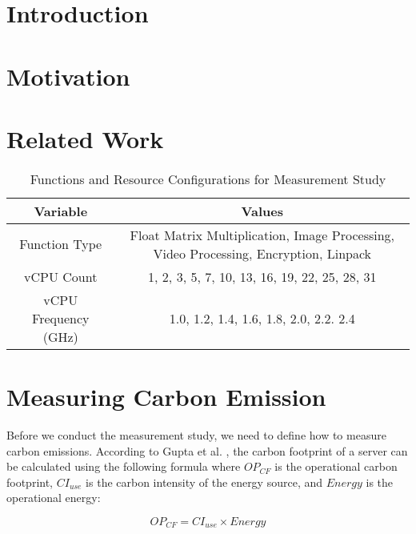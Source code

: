 \documentclass[times, 10pt,twocolumn]{article}
\begin{document}
\section{Introduction}

\section{Motivation}

\section{Related Work}

\begin{table*}[htbp]
   \centering
   \begin{tabular}{|c|c|}
   \hline
   \textbf{Variable} & \textbf{Values} \\ \hline
   Function Type & Float Matrix Multiplication, Image Processing, Video Processing, Encryption, Linpack \\ \hline
   vCPU Count & 1, 2, 3, 5, 7, 10, 13, 16, 19, 22, 25, 28, 31 \\ \hline
   vCPU Frequency (GHz) & 1.0, 1.2, 1.4, 1.6, 1.8, 2.0, 2.2. 2.4 \\ \hline
   \end{tabular}
   \caption{Functions and Resource Configurations for Measurement Study}
   \label{tab:mstudy1_configurations}
\end{table*}

\section{Measuring Carbon Emission}


Before we conduct the measurement study, we need to define how to measure carbon emissions. According to Gupta et al. \cite{gupta2022act}, the carbon footprint of a server can be calculated using the following formula where $OP_{CF}$ is the operational carbon footprint, $CI_{use}$ is the carbon intensity of the energy source, and $Energy$ is the operational energy:

\begin{equation}
   OP_{CF} = CI_{use} \times Energy
\end{equation}
\end{document}
